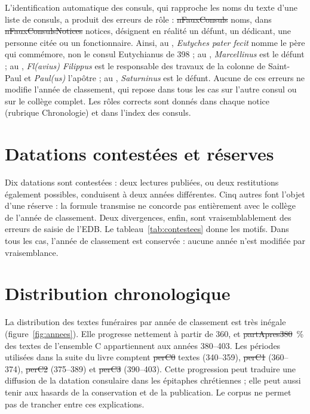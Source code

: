 L’identification automatique des consuls, qui rapproche les noms du texte d’une liste de consuls, a produit des erreurs de rôle : \st{nFauxConsuls} noms, dans \st{nFauxConsulsNotices} notices, désignent en réalité un défunt, un dédicant, une personne citée ou un fonctionnaire. Ainsi, au , \emph{Eutyches pater fecit} nomme le père qui commémore, non le consul Eutychianus de 398 ; au , \emph{Marcellinus} est le défunt ; au , \emph{Fl(avius) Filippus} est le responsable des travaux de la colonne de Saint-Paul et \emph{Paul(us)} l’apôtre ; au , \emph{Saturninus} est le défunt. Aucune de ces erreurs ne modifie l’année de classement, qui repose dans tous les cas sur l’autre consul ou sur le collège complet. Les rôles corrects sont donnés dans chaque notice (rubrique Chronologie) et dans l’index des consuls.

\section{Datations contestées et réserves}

Dix datations sont contestées : deux lectures publiées, ou deux restitutions également possibles, conduisent à deux années différentes. Cinq autres font l’objet d’une réserve : la formule transmise ne concorde pas entièrement avec le collège de l’année de classement. Deux divergences, enfin, sont vraisemblablement des erreurs de saisie de l’EDB. Le tableau~\ref{tab:contestees} donne les motifs. Dans tous les cas, l’année de classement est conservée : aucune année n’est modifiée par vraisemblance.



\section{Distribution chronologique}

La distribution des textes funéraires par année de classement est très inégale (figure~\ref{fig:annees}). Elle progresse nettement à partir de 360, et \st{partApres380}~\% des textes de l’ensemble C appartiennent aux années 380–403. Les périodes utilisées dans la suite du livre comptent \st{perC0} textes (340–359), \st{perC1} (360–374), \st{perC2} (375–389) et \st{perC3} (390–403). Cette progression peut traduire une diffusion de la datation consulaire dans les épitaphes chrétiennes ; elle peut aussi tenir aux hasards de la conservation et de la publication. Le corpus ne permet pas de trancher entre ces explications.
